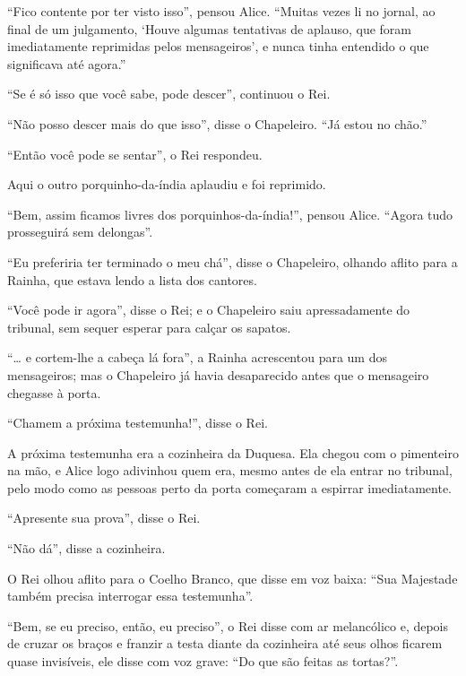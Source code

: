 
``Fico contente por ter visto isso'', pensou Alice. ``Muitas vezes li no
jornal, ao final de um julgamento, `Houve algumas tentativas de aplauso,
que foram imediatamente reprimidas pelos mensageiros', e nunca tinha
entendido o que significava até agora.''

``Se é só isso que você sabe, pode descer'', continuou o Rei.

``Não posso descer mais do que isso'', disse o Chapeleiro. ``Já estou no
chão.''

``Então você pode se sentar'', o Rei respondeu.

Aqui o outro porquinho-da-índia aplaudiu e foi reprimido.

``Bem, assim ficamos livres dos porquinhos-da-índia!'', pensou Alice.
``Agora tudo prosseguirá sem delongas''.

``Eu preferiria ter terminado o meu chá'', disse o Chapeleiro, olhando
aflito para a Rainha, que estava lendo a lista dos cantores.

``Você pode ir agora'', disse o Rei; e o Chapeleiro saiu apressadamente
do tribunal, sem sequer esperar para calçar os sapatos.

``\ldots{} e cortem-lhe a cabeça lá fora'', a Rainha acrescentou para um dos
mensageiros; mas o Chapeleiro já havia desaparecido antes que o
mensageiro chegasse à porta.

``Chamem a próxima testemunha!'', disse o Rei.

A próxima testemunha era a cozinheira da Duquesa. Ela chegou com o
pimenteiro na mão, e Alice logo adivinhou quem era, mesmo antes de ela
entrar no tribunal, pelo modo como as pessoas perto da porta começaram a
espirrar imediatamente.

``Apresente sua prova'', disse o Rei.

``Não dá'', disse a cozinheira.

O Rei olhou aflito para o Coelho Branco, que disse em voz baixa: ``Sua
Majestade também precisa interrogar essa testemunha''.

``Bem, se eu preciso, então, eu preciso'', o Rei disse com ar
melancólico e, depois de cruzar os braços e franzir a testa diante da
cozinheira até seus olhos ficarem quase invisíveis, ele disse com voz
grave: ``Do que são feitas as tortas?''.

